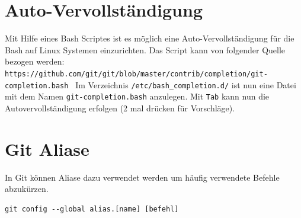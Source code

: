 \section{Auto-Vervollständigung}
Mit Hilfe eines Bash Scriptes ist es möglich eine Auto-Vervollständigung für die Bash auf Linux Systemen einzurichten. Das Script kann von folgender Quelle bezogen werden: \\
\texttt{https://github.com/git/git/blob/master/contrib/completion/git-completion.bash }
Im Verzeichnis \texttt{/etc/bash\_completion.d/} ist nun eine Datei mit dem Namen\newline
\texttt{git-completion.bash} anzulegen. Mit \texttt{Tab} kann nun die Autovervollständigung erfolgen (2 mal drücken für Vorschläge).
\section{Git Aliase}
In Git können Aliase dazu verwendet werden um häufig verwendete Befehle abzukürzen.\\
\begin{lstlisting}[caption={Alias},captionpos=b]
git config --global alias.[name] [befehl]
\end{lstlisting}